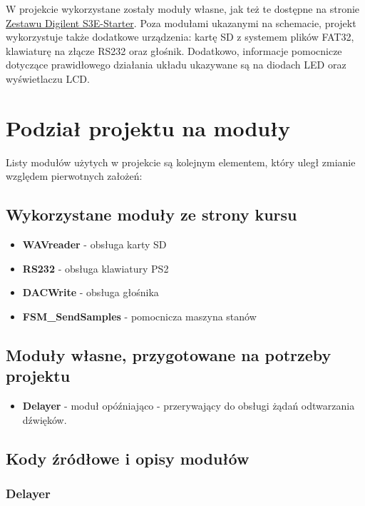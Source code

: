 \documentclass{article}
\begin{document}
W projekcie wykorzystane zostały moduły własne, jak też te dostępne na stronie \href{http://www.zsk.ict.pwr.wroc.pl/zsk_ftp/fpga/#_Toc99974115}{Zestawu Digilent S3E-Starter}.
Poza modułami ukazanymi na schemacie, projekt wykorzystuje także dodatkowe urządzenia: kartę SD z systemem plików FAT32, klawiaturę na złącze RS232 oraz głośnik. Dodatkowo, informacje pomocnicze dotyczące prawidłowego działania układu ukazywane są na diodach LED oraz wyświetlaczu LCD.

\section{Podział projektu na moduły}

Listy modułów użytych w projekcie są kolejnym elementem, który uległ zmianie względem pierwotnych założeń:

\subsection{Wykorzystane moduły ze strony kursu}

\begin{itemize}
    \item \textbf{WAVreader} - obsługa karty SD 
    \item \textbf{RS232} - obsługa klawiatury PS2 
    \item \textbf{DACWrite} - obsługa głośnika
    \item \textbf{FSM\_SendSamples} - pomocnicza maszyna stanów
\end{itemize}

\subsection{Moduły własne, przygotowane na potrzeby projektu}

\begin{itemize}
    \item \textbf{Delayer} - moduł opóźniająco - przerywający do obsługi żądań odtwarzania dźwięków.
\end{itemize}

\subsection{Kody źródłowe i opisy modułów}

\subsubsection{Delayer}
\end{document}
